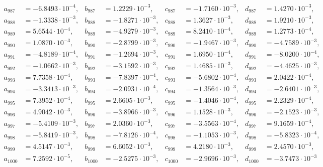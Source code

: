 \begin{align*}
  a_{ 987 } &= -6.8493 \cdot 10^{ -4 }, & b_{ 987 } &= 1.2229 \cdot 10^{ -3 }, & c_{ 987 } &= -1.7160 \cdot 10^{ -3 }, & d_{ 987 } &= 1.4270 \cdot 10^{ -3 }, \\ 
  a_{ 988 } &= -1.3338 \cdot 10^{ -3 }, & b_{ 988 } &= -1.8271 \cdot 10^{ -3 }, & c_{ 988 } &= 1.3627 \cdot 10^{ -3 }, & d_{ 988 } &= 1.9210 \cdot 10^{ -3 }, \\ 
  a_{ 989 } &= 5.6544 \cdot 10^{ -4 }, & b_{ 989 } &= -4.9279 \cdot 10^{ -3 }, & c_{ 989 } &= 8.2410 \cdot 10^{ -4 }, & d_{ 989 } &= 1.2773 \cdot 10^{ -4 }, \\ 
  a_{ 990 } &= 1.0870 \cdot 10^{ -3 }, & b_{ 990 } &= -2.8799 \cdot 10^{ -3 }, & c_{ 990 } &= -1.9467 \cdot 10^{ -3 }, & d_{ 990 } &= -4.7589 \cdot 10^{ -3 }, \\ 
  a_{ 991 } &= -4.8189 \cdot 10^{ -4 }, & b_{ 991 } &= -1.2694 \cdot 10^{ -3 }, & c_{ 991 } &= 1.6950 \cdot 10^{ -4 }, & d_{ 991 } &= -8.0200 \cdot 10^{ -4 }, \\ 
  a_{ 992 } &= -1.0662 \cdot 10^{ -3 }, & b_{ 992 } &= -3.1592 \cdot 10^{ -3 }, & c_{ 992 } &= 1.4685 \cdot 10^{ -3 }, & d_{ 992 } &= -4.4625 \cdot 10^{ -3 }, \\ 
  a_{ 993 } &= 7.7358 \cdot 10^{ -4 }, & b_{ 993 } &= -7.8397 \cdot 10^{ -4 }, & c_{ 993 } &= -5.6802 \cdot 10^{ -4 }, & d_{ 993 } &= 2.0422 \cdot 10^{ -4 }, \\ 
  a_{ 994 } &= -3.3413 \cdot 10^{ -3 }, & b_{ 994 } &= -2.0931 \cdot 10^{ -4 }, & c_{ 994 } &= -1.3564 \cdot 10^{ -3 }, & d_{ 994 } &= -2.6401 \cdot 10^{ -3 }, \\ 
  a_{ 995 } &= 7.3952 \cdot 10^{ -4 }, & b_{ 995 } &= 2.6605 \cdot 10^{ -3 }, & c_{ 995 } &= -1.4046 \cdot 10^{ -4 }, & d_{ 995 } &= 2.2329 \cdot 10^{ -4 }, \\ 
  a_{ 996 } &= 4.9042 \cdot 10^{ -3 }, & b_{ 996 } &= -3.8966 \cdot 10^{ -3 }, & c_{ 996 } &= 1.1528 \cdot 10^{ -3 }, & d_{ 996 } &= -2.1523 \cdot 10^{ -3 }, \\ 
  a_{ 997 } &= -5.4109 \cdot 10^{ -3 }, & b_{ 997 } &= 2.0360 \cdot 10^{ -3 }, & c_{ 997 } &= -3.5563 \cdot 10^{ -4 }, & d_{ 997 } &= 9.1659 \cdot 10^{ -4 }, \\ 
  a_{ 998 } &= -5.8419 \cdot 10^{ -3 }, & b_{ 998 } &= -7.8126 \cdot 10^{ -4 }, & c_{ 998 } &= -1.1053 \cdot 10^{ -3 }, & d_{ 998 } &= -5.8323 \cdot 10^{ -4 }, \\ 
  a_{ 999 } &= 4.5147 \cdot 10^{ -3 }, & b_{ 999 } &= 6.6052 \cdot 10^{ -3 }, & c_{ 999 } &= 4.2180 \cdot 10^{ -3 }, & d_{ 999 } &= 2.4570 \cdot 10^{ -3 }, \\ 
  a_{ 1000 } &= 7.2592 \cdot 10^{ -5 }, & b_{ 1000 } &= -2.5275 \cdot 10^{ -3 }, & c_{ 1000 } &= -2.9696 \cdot 10^{ -3 }, & d_{ 1000 } &= -3.7473 \cdot 10^{ -3 }
\end{align*}
